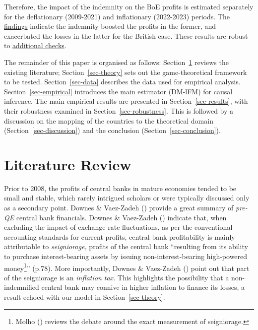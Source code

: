 \documentclass[
  a4paper,
  abstract=true]{scrartcl}
\theoremstyle{definition}
\begin{document}
Therefore, the impact of the indemnity on the BoE profits is estimated
separately for the deflationary (2009-2021) and inflationary (2022-2023)
periods. The \hyperref[sec-results]{findings} indicate the indemnity
boosted the profits in the former, and exacerbated the losses in the
latter for the British case. These results are robust to
\hyperref[sec-robustness]{additional checks}.

The remainder of this paper is organised as follows:
Section~\ref{sec-litreview} reviews the existing literature;
Section~\ref{sec-theory} sets out the game-theoretical framework to be
tested. Section~\ref{sec-data} describes the data used for empirical
analysis. Section~\ref{sec-empirical} introduces the main estimator
(DM-lFM) for causal inference. The main empirical results are presented
in Section~\ref{sec-results}, with their robustness examined in
Section~\ref{sec-robustness}. This is followed by a discussion on the
mapping of the countries to the theoretical domain
(Section~\ref{sec-discussion}) and the conclusion
(Section~\ref{sec-conclusion}).

\section{Literature Review}\label{sec-litreview}

Prior to 2008, the profits of central banks in mature economies tended
to be small and stable, which rarely intrigued scholars or were
typically discussed only as a secondary point. Downes \& Vaez-Zadeh
() provide a great summary of
\emph{pre-QE} central bank financials. Downes \& Vaez-Zadeh
() indicate that, when excluding the
impact of exchange rate fluctuations, as per the conventional accounting
standards for current profits, central bank profitability is mainly
attributable to \emph{seigniorage,} profits of the central bank
``resulting from its ability to purchase interest-bearing assets by
issuing non-interest-bearing high-powered money\footnote{Molho
  () reviews the debate around the exact
  measurement of seigniorage.}'' (p.78). More importantly, Downes \&
Vaez-Zadeh () point out that part of the
seigniorage is an \emph{inflation tax.} This highlights the possibility
that a non-indemnified central bank may connive in higher inflation to
finance its losses, a result echoed with our model in
Section~\ref{sec-theory}.
\end{document}
